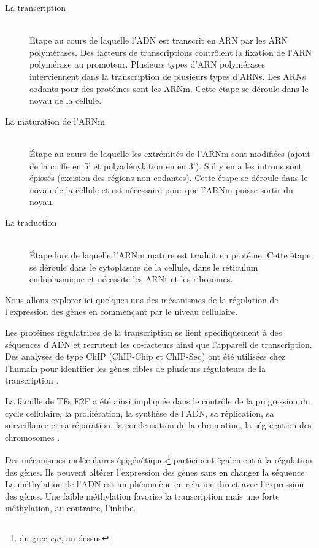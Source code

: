 			\begin{description}
					\item [La transcription]              \hfill \\
						Étape au cours de laquelle l'\acs{ADN} est transcrit en \acs{ARN} par les \acs{ARN} polymérases.
						Des facteurs de transcriptions contrôlent la fixation de l'\acs{ARN} polymérase au promoteur.
						Plusieurs types d'\acs{ARN} polymérases interviennent dans la transcription de plusieurs types d'\acsp{ARN}.
						Les \acsp{ARN} codants pour des protéines sont les \acs{ARNm}.
						Cette étape se déroule dans le noyau de la cellule.
					\item [La maturation de l'\acs{ARNm}] \hfill \\
						Étape au cours de laquelle les extrémités de l'\acs{ARNm} sont modifiées (ajout de la coiffe en 5' et polyadénylation en en 3').
						S'il y en a les introns sont épissés (excision des régions non-codantes).
						Cette étape se déroule dans le noyau de la cellule et est nécessaire pour que l'\acs{ARNm} puisse sortir du noyau.
					\item [La traduction]                 \hfill \\
						Étape lors de laquelle l'\acs{ARNm} mature est traduit en protéine.
						Cette étape se déroule dans le cytoplasme de la cellule, dans le réticulum endoplasmique et nécessite les \acs{ARNt} et les ribosomes.
			\end{description}
			\vspace{1.5ex}

			Nous allons explorer ici quelques-uns des mécanismes de la régulation de l'expression des gènes en commençant par le niveau cellulaire.

			Les protéines régulatrices de la transcription se lient spécifiquement à des séquences d'\acs{ADN} et recrutent les co-facteurs ainsi que l'appareil de transcription.
			Des analyses de type \ac{ChIP} (\ac{ChIP-Chip} et \ac{ChIP-Seq}) ont été utilisées chez l'humain pour identifier les gènes cibles de plusieurs régulateurs de la transcription \citep{Ren2000, Park2009, NguyenDuc2013}.

			La famille de \acp{TF} \acs{E2F} a été ainsi impliquée dans le contrôle de la progression du cycle cellulaire, la prolifération, la synthèse de l'\acs{ADN}, sa réplication, sa surveillance et sa réparation, la condensation de la chromatine, la ségrégation des chromosomes \citep{Ren2002}.

			Des mécanismes moléculaires épigénétiques\footnote{du grec \emph{epi}, au dessus} participent également à la régulation des gènes.
			Ils peuvent altérer l'expression des gènes sans en changer la séquence.
			La méthylation de l'\acs{ADN} est un phénomène en relation direct avec l'expression des gènes.
			Une faible méthylation favorise la transcription mais une forte méthylation, au contraire, l'inhibe.

